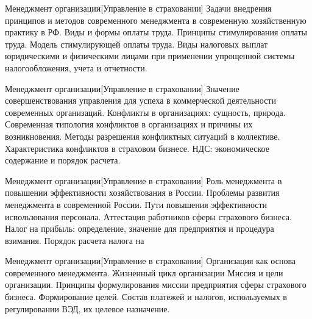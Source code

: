 \documentclass[
	11pt,
	a4paper,
	]
	{article}
\begin{document}
	

\begin{minipage}[t][\miniH]{\miniL}\centering
	 {Менеджмент организации}[Управление в страховании]
		{
			Задачи внедрения принципов и методов современного менеджмента в современную хозяйственную практику в РФ.
		}{
			Виды и формы оплаты труда. Принципы стимулирования оплаты труда. Модель стимулирующей оплаты труда.
		}{
			Виды налоговых выплат юридическими и физическими лицами при применении упрощенной системы налогообложения, учета и отчетности.
		}
	\lowGE
\end{minipage}

\vfill



\begin{minipage}[t][\miniH]{\miniL}\centering
	 {Менеджмент организации}[Управление в страховании]
		{
			Значение совершенствования управления для успеха в коммерческой деятельности современных организаций.
		}{
			Конфликты в организациях: сущность, природа. Современная типология конфликтов в организациях и причины их возникновения. Методы разрешения конфликтных ситуаций в коллективе. Характеристика конфликтов в страховом бизнесе.
		}{
			НДС: экономическое содержание и порядок расчета.
		}
	\lowGE
\end{minipage}

\vfill



\begin{minipage}[t][\miniH]{\miniL}\centering
	 {Менеджмент организации}[Управление в страховании]
		{
			Роль менеджмента в повышении эффективности хозяйствования в России. Проблемы развития менеджмента в современной России.
		}{
			Пути повышения эффективности использования персонала. Аттестация работников сферы страхового бизнеса.
		}{
			Налог на прибыль: определение, значение для предприятия и процедура взимания. Порядок расчета налога на
		}
	\lowGE
\end{minipage}





\begin{minipage}[t][\miniH]{\miniL}\centering
	 {Менеджмент организации}[Управление в страховании]
		{
			Организация как основа современного менеджмента. Жизненный цикл организации
		}{
			Миссия и цели организации. Принципы формулирования миссии предприятия сферы страхового бизнеса. Формирование целей.
		}{
			Состав платежей и налогов, используемых в регулировании ВЭД, их целевое назначение.
		}
	\lowGE
\end{minipage}
\end{document}

